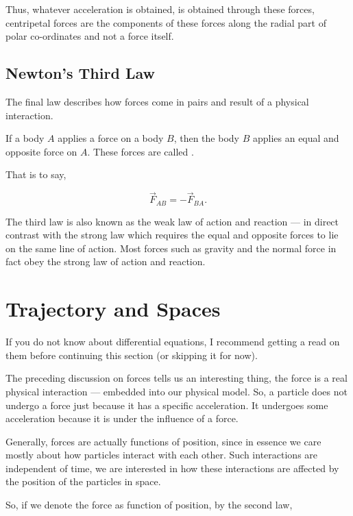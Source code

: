 Thus, whatever acceleration is obtained, is obtained through these forces, centripetal forces
are the components of these forces along the radial part of polar co-ordinates and not 
a force itself.

\subsection{Newton's Third Law}

The final law describes how forces come in pairs and result of a physical interaction.

\begin{axioms}
     If a body \(A\) applies a force on a body \(B\), then the body 
    \(B\) applies an equal and opposite force on \(A\). These forces are 
    called .
\end{axioms}

That is to say, 

\[\vec{F}_{AB} = - \vec{F}_{BA}.\]

The third law is also known as the weak law of action and reaction ---
in direct contrast with the strong law which requires the equal and opposite
forces to lie on the same line of action. Most forces such as gravity and the
normal force in fact obey the strong law of action and reaction.

\section{Trajectory and Spaces}

If you do not know about differential 
equations, I recommend getting a read on them before continuing this section (or skipping it for now).

The preceding discussion on forces tells us an interesting thing, 
the force is a real physical interaction --- embedded into our physical model.
So, a particle does not undergo a force just because it has a specific 
acceleration. It undergoes some acceleration because it is under the influence of a force.

Generally, forces are actually functions of position, since in essence we care mostly 
about how particles interact with each other. Such interactions are independent of time, 
we are interested in how these interactions are affected by the position of the particles in space.

So, if we denote the force as function of position, by the second law, 

